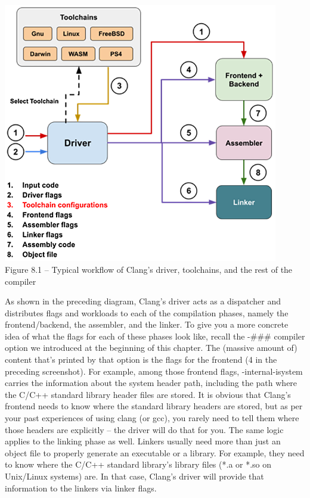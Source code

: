 \hspace*{\fill} \\ %
\begin{center}
\includegraphics[width=0.9\textwidth]{content/2/chapter8/images/1.png}\\
Figure 8.1 – Typical workflow of Clang's driver, toolchains, and the rest of the compiler
\end{center}

As shown in the preceding diagram, Clang's driver acts as a dispatcher and distributes flags and workloads to each of the compilation phases, namely the frontend/backend, the assembler, and the linker. To give you a more concrete idea of what the flags for each of these phases look like, recall the -\#\#\# compiler option we introduced at the beginning of this chapter. The (massive amount of) content that's printed by that option is the flags for the frontend (4 in the preceding screenshot). For example, among those frontend flags, -internal-isystem carries the information about the system header path, including the path where the C/C++ standard library header files are stored. It is obvious that Clang's frontend needs to know where the standard library headers are stored, but as per your past experiences of using clang (or gcc), you rarely need to tell them where those headers are explicitly – the driver will do that for you. The same logic applies to the linking phase as well. Linkers usually need more than just an object file to properly generate an executable or a library. For example, they need to know where the C/C++ standard library's library files (*.a or *.so on Unix/Linux systems) are. In that case, Clang's driver will provide that information to the linkers via linker flags.


